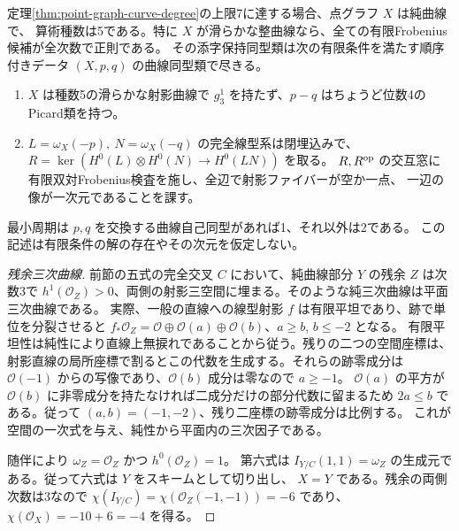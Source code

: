 \begin{theorem}\label{thm:septic-point-graph}
定理\ref{thm:point-graph-curve-degree}の上限7に達する場合、点グラフ $X$ は純曲線で、
算術種数は5である。特に $X$ が滑らかな整曲線なら、全ての有限Frobenius候補が全次数で正則である。
その添字保持同型類は次の有限条件を満たす順序付きデータ $(X,p,q)$ の曲線同型類で尽きる。
\begin{enumerate}
\item $X$ は種数5の滑らかな射影曲線で $g^1_3$ を持たず、$p-q$ はちょうど位数4のPicard類を持つ。
\item $L=\omega_X(-p),\ N=\omega_X(-q)$ の完全線型系は閉埋込みで、
$R=\ker(H^0(L)\otimes H^0(N)\to H^0(LN))$ を取る。
$R,R^{\rm op}$ の交互窓に有限双対Frobenius検査を施し、全辺で射影ファイバーが空か一点、
一辺の像が一次元であることを課す。
\end{enumerate}
最小周期は $p,q$ を交換する曲線自己同型があれば1、それ以外は2である。
この記述は有限条件の解の存在やその次元を仮定しない。
\end{theorem}
\begin{proof}[残余三次曲線]
前節の五式の完全交叉 $C$ において、純曲線部分 $Y$ の残余 $Z$ は次数3で
$h^1(\mathcal O_Z)>0$、両側の射影三空間に埋まる。そのような純三次曲線は平面三次曲線である。
実際、一般の直線への線型射影 $f$ は有限平坦であり、跡で単位を分裂させると
$f_*\mathcal O_Z=\mathcal O\oplus\mathcal O(a)\oplus\mathcal O(b)$、$a\ge b$, $b\le-2$ となる。
有限平坦性は純性により直線上無捩れであることから従う。残りの二つの空間座標は、
射影直線の局所座標で割るとこの代数を生成する。それらの跡零成分は
$\mathcal O(-1)$ からの写像であり、$\mathcal O(b)$ 成分は零なので $a\ge-1$。
$\mathcal O(a)$ の平方が $\mathcal O(b)$ に非零成分を持たなければ二成分だけの部分代数に留まるため
$2a\le b$ である。従って $(a,b)=(-1,-2)$、残り二座標の跡零成分は比例する。
これが空間の一次式を与え、純性から平面内の三次因子である。

随伴により $\omega_Z=\mathcal O_Z$ かつ $h^0(\mathcal O_Z)=1$。
第六式は $I_{Y/C}(1,1)=\omega_Z$ の生成元である。従って六式は $Y$ をスキームとして切り出し、
$X=Y$ である。残余の両側次数は3なので
$\chi(I_{Y/C})=\chi(\mathcal O_Z(-1,-1))=-6$ であり、$\chi(\mathcal O_X)=-10+6=-4$ を得る。
\end{proof}

